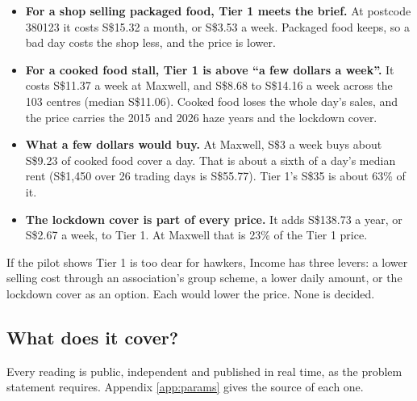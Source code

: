 \documentclass[11pt,a4paper]{article}
\newcommand{\sgd}{\textup{S\$}}
\begin{document}
\begin{itemize}[leftmargin=1.2em]
  \item \textbf{For a shop selling packaged food, Tier 1 meets the brief.} At postcode 380123 it costs \sgd 15.32 a month, or \sgd 3.53 a week. Packaged food keeps, so a bad day costs the shop less, and the price is lower.
  \item \textbf{For a cooked food stall, Tier 1 is above ``a few dollars a week''.} It costs \sgd 11.37 a week at Maxwell, and \sgd 8.68 to \sgd 14.16 a week across the 103 centres (median \sgd 11.06). Cooked food loses the whole day's sales, and the price carries the 2015 and 2026 haze years and the lockdown cover.
  \item \textbf{What a few dollars would buy.} At Maxwell, \sgd 3 a week buys about \sgd 9.23 of cooked food cover a day. That is about a sixth of a day's median rent (\sgd 1,450 over 26 trading days is \sgd 55.77). Tier 1's \sgd 35 is about 63\% of it.
  \item \textbf{The lockdown cover is part of every price.} It adds \sgd 138.73 a year, or \sgd 2.67 a week, to Tier 1. At Maxwell that is 23\% of the Tier 1 price.
\end{itemize}

If the pilot shows Tier 1 is too dear for hawkers, Income has three levers: a lower selling cost through an association's group scheme, a lower daily amount, or the lockdown cover as an option. Each would lower the price. None is decided.

\subsection{What does it cover?}\label{sec:triggers}

Every reading is public, independent and published in real time, as the problem statement requires. Appendix \ref{app:params} gives the source of each one.
\end{document}
